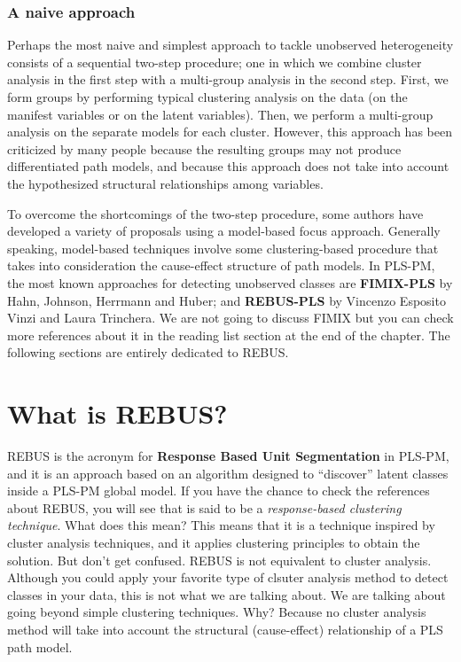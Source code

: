 \documentclass[12pt]{book}\usepackage{graphicx, color}
\begin{document}
\subsubsection*{A naive approach}
Perhaps the most naive and simplest approach to tackle unobserved heterogeneity consists of a sequential two-step procedure; one in which we combine cluster analysis in the first step with a
multi-group analysis in the second step. First, we form groups by performing typical clustering analysis on the data (on the manifest variables or on the latent variables). Then, we perform a multi-group analysis on the separate models for each cluster. However, this approach has been criticized by many people because the resulting groups may not produce differentiated path models, and because this approach does not take into account the hypothesized structural relationships among variables.

To overcome the shortcomings of the two-step procedure, some authors have developed a variety of proposals using a model-based focus approach. Generally speaking, model-based techniques involve some clustering-based procedure that takes into consideration the cause-effect structure of path models. In PLS-PM, the most known approaches for detecting unobserved classes are \textbf{FIMIX-PLS} by Hahn, Johnson, Herrmann and Huber; and \textbf{REBUS-PLS} by Vincenzo Esposito Vinzi and Laura Trinchera. We are not going to discuss FIMIX but you can check more references about it in the reading list section at the end of the chapter. The following sections are entirely dedicated to REBUS.



\section{What is REBUS?}
REBUS is the acronym for \textbf{Response Based Unit Segmentation} in PLS-PM, and it is an approach based on an algorithm designed to ``discover'' latent classes inside a PLS-PM global model. If you have the chance to check the references about REBUS, you will see that is said to be a \textit{response-based clustering technique}. What does this mean? This means that it is a technique inspired by cluster analysis techniques, and it applies clustering principles to obtain the solution. But don't get confused. REBUS is not equivalent to cluster analysis. Although you could apply your favorite type of clsuter analysis method to detect classes in your data, this is not what we are talking about. We are talking about going beyond simple clustering techniques. Why? Because no cluster analysis method will take into account the structural (cause-effect) relationship of a PLS path model. 
\end{document}

